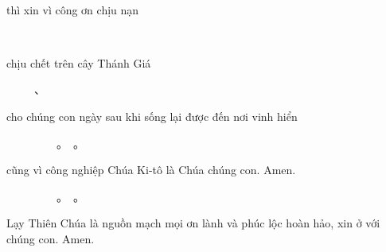 \documentclass[12pt]{article}
\begin{document}
\begin{paracol}{2}
\begin{leftcolumn*}
\Large{\ \ \ }\\
\end{leftcolumn*}

\begin{rightcolumn}
thì xin vì công ơn chịu nạn\\
\end{rightcolumn}

\begin{leftcolumn*}
\Large{\ \ \ \ \ \ \ }\\										
\end{leftcolumn*}

\begin{rightcolumn}
chịu chết trên cây Thánh Giá\\
\end{rightcolumn}

\begin{leftcolumn*}
\Large{\ \ \ \ \ 、}\\
\end{leftcolumn*}

\begin{rightcolumn}
cho chúng con ngày sau khi sống lại được đến nơi vinh hiển\\[2cm]	
\end{rightcolumn}

\begin{leftcolumn*}
\Large{\ \ \ \ \ \ \ \ \ 。\ 。}\\
\end{leftcolumn*}

\begin{rightcolumn}
cũng vì công nghiệp Chúa Ki-tô là Chúa chúng con. Amen.\\
\end{rightcolumn}

\begin{leftcolumn*}
\Large{\ \ \ \ \ \ \ \ \ 。\ 。}\\
\end{leftcolumn*}

\begin{rightcolumn}
Lạy Thiên Chúa là nguồn mạch mọi ơn lành và phúc lộc hoàn hảo, xin ở với chúng con. Amen.
\end{rightcolumn}

\end{paracol}
\end{document}

